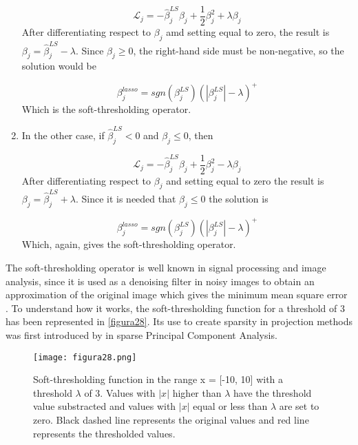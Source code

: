 \begin{enumerate}
    \begin{equation}
        \mathcal{L}_j = -\hat{\beta}^{LS}_j\beta_j+\frac{1}{2}\beta^2_j+\lambda\beta_j
    \end{equation}
    After differentiating respect to $\beta_j$ amd setting equal to zero, the result is $\beta_j = \hat{\beta}^{LS}_j-\lambda$. Since $\beta_j \geq 0$, the right-hand side must be non-negative, so the solution would be
    
    \begin{equation}
        \beta_j^{lasso}=sgn(\beta_j^{LS})(|\beta_j^{LS}|-\lambda)^+
    \end{equation}
    Which is the soft-thresholding operator.
    \item In the other case, if $\hat{\beta}^{LS}_j < 0$ and $\beta_j \leq 0$, then
    
    \begin{equation}
        \mathcal{L}_j = -\hat{\beta}^{LS}_j\beta_j+\frac{1}{2}\beta^2_j-\lambda\beta_j
    \end{equation}
    After differentiating respect to $\beta_j$ and setting equal to zero the result is $\beta_j = \hat{\beta}^{LS}_j+\lambda$. Since it is needed that $\beta_j \leq 0$ the solution is
    
    \begin{equation}
        \beta_j^{lasso}=sgn(\beta_j^{LS})(|\beta_j^{LS}|-\lambda)^+
    \end{equation}
    Which, again, gives the soft-thresholding operator.
\end{enumerate}

\vspace{20pt}
The soft-thresholding operator is well known in signal processing and image analysis, since it is used as a denoising filter in noisy images to obtain an approximation of the original image which gives the minimum mean square error \parencite{khare2005soft, joy2013denoising}. To understand how it works, the soft-thresholding function for a threshold of 3 has been represented in \autoref{figura28}. Its use to create sparsity in projection methods was first introduced by \textcite{zou2006sparse} in sparse Principal Component Analysis.
\vspace{10pt}

\begin{figure}[hbtp]
\centering
\texttt{[image: figura28.png]}
\caption[Soft-thresholding function]{Soft-thresholding function in the range x = [-10, 10] with a threshold $\lambda$ of 3. Values with $|x|$ higher than $\lambda$ have the threshold value substracted and values with $|x|$ equal or less than $\lambda$ are set to zero. Black dashed line represents the original values and red line represents the thresholded values.}
\label{figura28}
\end{figure}